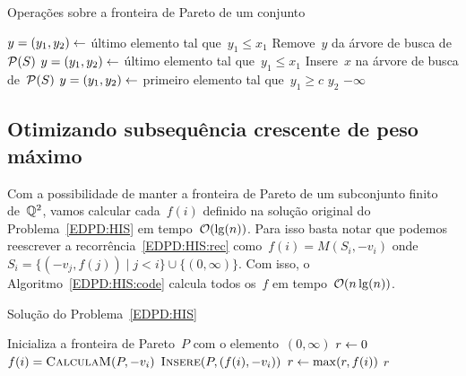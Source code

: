 \begin{algorithm}[h]
\caption{Operações sobre a fronteira de Pareto de um conjunto}
\label{EDPD:FP:code}
\begin{algorithmic}[1]
    \State $y = (y_1,y_2) \leftarrow$ último elemento tal que~$y_1 \leq x_1$
        \State Remove~$y$ da árvore de busca de~$\mathcal{P}(S)$
        \State $y = (y_1,y_2) \leftarrow$ último elemento tal que~$y_1 \leq x_1$
    \EndWhile
        \State Insere~$x$ na árvore de busca de~$\mathcal{P}(S)$
    \EndIf
\EndFunction
{}
    \State $y = (y_1,y_2) \leftarrow$ primeiro elemento tal que~$y_1 \geq c$
        \State \Return $y_2$
    \Else
        \State \Return $-\infty$
    \EndIf
\EndFunction
\end{algorithmic}
\end{algorithm}



\subsection{Otimizando subsequência crescente de peso máximo}

Com a possibilidade de manter a fronteira de Pareto de um subconjunto finito de~$\mathbb{Q}^2$, vamos calcular cada~$f(i)$ definido na solução original do Problema~\ref{EDPD:HIS} em tempo~$\mathcal{O}(\lg(n))$. Para isso basta notar que podemos reescrever a recorrência~\ref{EDPD:HIS:rec} como~$f(i) = M(S_i,-v_i)$ onde~$S_i = \{(-v_j,f(j)) \mid j < i\} \cup \{(0,\infty)\}$. Com isso, o Algoritmo~\ref{EDPD:HIS:code} calcula todos os~$f$ em tempo~$\mathcal{O}(n\lg(n))$.

\begin{algorithm}[h]
\caption{Solução do Problema~\ref{EDPD:HIS}}
\label{EDPD:HIS:code}
\begin{algorithmic}[1]
    \State Inicializa a fronteira de Pareto~$P$ com o elemento~$(0,\infty)$
    \State $r \leftarrow 0$
        \State $f(i) = \textsc{CalculaM}(P,-v_i)$
        \State $\textsc{Insere}(P,(f(i),-v_i))$
        \State $r \leftarrow \max(r,f(i))$
    \EndFor
    \State \Return $r$
\EndFunction
\end{algorithmic}
\end{algorithm}
